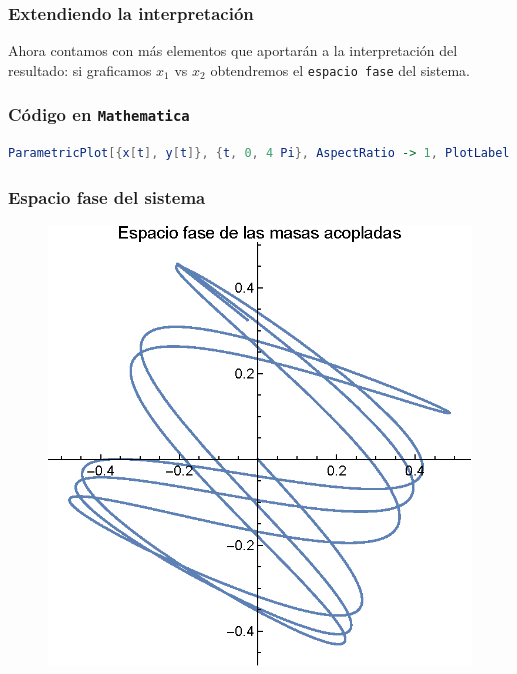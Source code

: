 \begin{frame}   
\frametitle{Extendiendo la interpretación}
Ahora contamos con más elementos que aportarán a la interpretación del resultado: si graficamos $x_{1}$ vs $x_{2}$ obtendremos el \texttt{espacio fase} del sistema.
\end{frame}
\begin{frame}[fragile]
\frametitle{Código en \texttt{Mathematica}}
\begin{lstlisting}[language=Mathematica]
ParametricPlot[{x[t], y[t]}, {t, 0, 4 Pi}, AspectRatio -> 1, PlotLabel -> "Espacio fase de las masas acopladas", LabelStyle -> Directive[FontSize -> 12]]
\end{lstlisting}    
\end{frame}
\begin{frame}
\frametitle{Espacio fase del sistema}
\begin{figure}[H]
    \centering
    \includegraphics[scale=0.7]{Imagenes/Ejercicio_masas_acopladas_03.eps}
\end{figure}
\end {frame}
